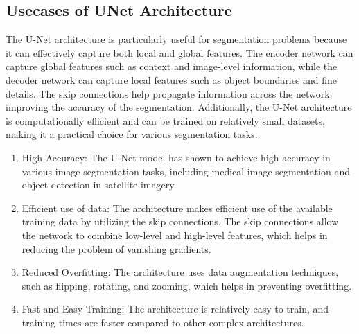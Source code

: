 \subsection{Usecases of UNet Architecture}
The U-Net architecture is particularly useful for segmentation problems because it can effectively capture both local and global features. The encoder network can capture global features such as context and image-level information, while the decoder network can capture local features such as object boundaries and fine details. The skip connections help propagate information across the network, improving the accuracy of the segmentation. Additionally, the U-Net architecture is computationally efficient and can be trained on relatively small datasets, making it a practical choice for various segmentation tasks.
\begin{enumerate}
    \item High Accuracy: The U-Net model has shown to achieve high accuracy in various image segmentation tasks, including medical image segmentation and object detection in satellite imagery.
    \item Efficient use of data: The architecture makes efficient use of the available training data by utilizing the skip connections. The skip connections allow the network to combine low-level and high-level features, which helps in reducing the problem of vanishing gradients.
    \item Reduced Overfitting: The architecture uses data augmentation techniques, such as flipping, rotating, and zooming, which helps in preventing overfitting.
    \item Fast and Easy Training: The architecture is relatively easy to train, and training times are faster compared to other complex architectures.
\end{enumerate}

